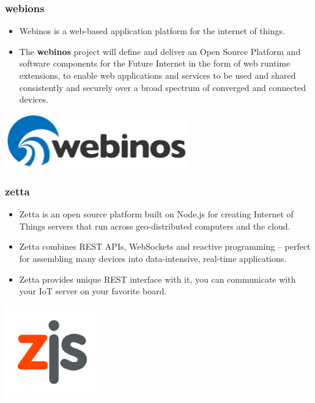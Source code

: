 \documentclass{beamer}
\begin{document}
\begin{frame}
	\frametitle{webions}
	\begin{itemize}
		\item Webinos is a web-based application platform for the internet of things.
		\item The \textbf{webinos} project will define and deliver an Open Source Platform and software components for the Future Internet in the form of web runtime extensions, to enable web applications and services to be used and shared consistently and securely over a broad spectrum of converged and connected devices.
	\end{itemize}
	\vspace{.1cm}
	\hspace*{3cm} \includegraphics[width=8cm]{figs/webinos-logo.png}
\end{frame}

\begin{frame}
	\frametitle{zetta}
	\vspace{.1cm}
	\begin{itemize}
		\justifying
		\item Zetta is an open source platform built on Node.js for creating Internet of Things servers that run across geo-distributed computers and the cloud.
		\item Zetta combines REST APIs, WebSockets and reactive programming – perfect for assembling many devices into data-intensive, real-time applications.
		\item Zetta provides unique REST interface with it, you can communicate with your IoT server on your favorite board.
	\end{itemize}
	\hspace*{5.5cm} \includegraphics[width=4cm]{figs/zjs.png}
\end{frame}
\end{document}
